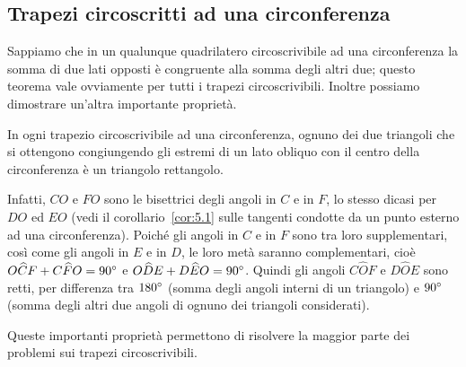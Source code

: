 \setlength{\intextsep}{\defintextsep}
\subsection{Trapezi circoscritti ad una circonferenza}

Sappiamo che in un qualunque quadrilatero circoscrivibile ad una circonferenza la somma di due lati opposti è congruente alla somma degli altri due; questo teorema vale ovviamente per tutti i trapezi circoscrivibili.
Inoltre possiamo dimostrare un'altra importante proprietà.

\begin{proprieta}
In ogni trapezio circoscrivibile ad una circonferenza, ognuno dei due triangoli che si ottengono congiungendo gli estremi di un lato obliquo con il centro della circonferenza è un triangolo rettangolo.
\end{proprieta}

\setlength{\intextsep}{3pt plus 2.0pt minus 2.0pt}
\begin{wrapfigure}{r}{0.35\textwidth}
	\centering
\end{wrapfigure}
Infatti, $CO$ e $FO$ sono le bisettrici degli angoli in $C$ e in $F$, lo stesso dicasi per $DO$ ed $EO$ (vedi il corollario~\ref{cor:5.1} sulle tangenti condotte da un punto esterno ad una circonferenza). Poiché gli angoli in $C$ e in $F$ sono tra loro supplementari, così come gli angoli in $E$ e in $D$, le loro metà saranno complementari, cioè $O\widehat{C}F+C\widehat{F}O=90{}^{\circ}$ e $O\widehat{D}E+D\widehat{E}O=90{}^{\circ}$. Quindi gli angoli $C\widehat{O}F$ e $D\widehat{O}E$ sono retti, per differenza tra $180{}^{\circ}$ (somma degli angoli interni di un triangolo) e $90{}^{\circ}$ (somma degli altri due angoli di ognuno dei triangoli considerati).

Queste importanti proprietà permettono di risolvere la maggior parte dei problemi sui trapezi circoscrivibili.

\setlength{\intextsep}{\defintextsep}

